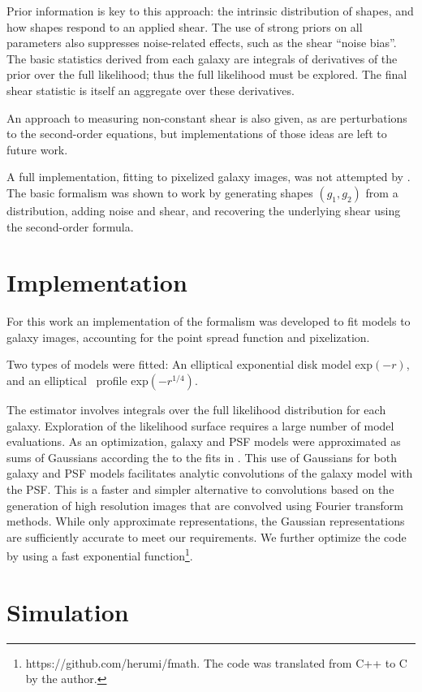 \documentclass[12pt,preprint]{aastex}
\begin{document}
Prior information is key to this approach: the intrinsic distribution of
shapes, and how shapes respond to an applied shear.  The use of strong priors
on all parameters also suppresses noise-related effects, such as the shear
``noise bias''.  The basic statistics derived from each galaxy are integrals of
derivatives of the prior over the full likelihood; thus the full likelihood
must be explored.  The final shear statistic is itself an aggregate over these
derivatives.

An approach to measuring non-constant shear is also given, as are perturbations
to the second-order equations, but implementations of those ideas are left to
future work.

A full implementation, fitting to pixelized galaxy images, was not attempted by
\citet{ba13}.  The basic formalism was shown to work by generating shapes
$(g_1,g_2)$ from a distribution, adding noise and shear, and recovering the
underlying shear using the second-order formula.

\section{Implementation} \label{sec:impl}

For this work an implementation of the \citet{ba13} formalism was developed to
fit models to galaxy images, accounting for the point spread function and
pixelization.

Two types of models were fitted: An elliptical exponential disk model exp$(-r)$,
and an elliptical \devauc\ profile exp$( -r^{1/4} )$.

The estimator involves integrals over the full likelihood distribution for each
galaxy.  Exploration of the likelihood surface requires a large number of model
evaluations.  As an optimization, galaxy and PSF models were approximated as
sums of Gaussians according the to the fits in \citet{HoggGMix12}.  This use of
Gaussians for both galaxy and PSF models facilitates analytic convolutions of
the galaxy model with the PSF.  This is a faster and simpler alternative to
convolutions based on the generation of high resolution images that are
convolved using Fourier transform methods. While only approximate
representations, the Gaussian representations are sufficiently accurate to meet
our requirements.  We further optimize the code by using a fast exponential
function\footnote{https://github.com/herumi/fmath.  The code was translated
from C++ to C by the author.}.

\section{Simulation} \label{sec:sim}
\end{document}
